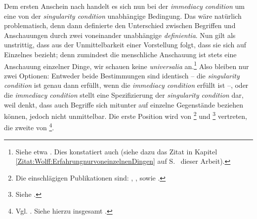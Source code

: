 Dem ersten Anschein nach handelt es sich nun bei der \emph{immediacy condition}
um eine von der \emph{singularity condition} unabhängige Bedingung. Das wäre
natürlich problematisch, denn dann definierte  den
Unterschied zwischen Begriffen und Anschauungen durch zwei voneinander
unabhängige \emph{definientia}. Nun gilt als unstrittig, dass aus der
Unmittelbarkeit einer Vorstellung folgt, dass sie sich auf Einzelnes bezieht;
denn zumindest die menschliche Anschauung ist stets eine Anschauung einzelner
Dinge, wir schauen keine \emph{universalia}
an.\footnote{Siehe etwa \cite[][45]{Parsons:KantsPhilosophyofArithmetic1992}.
Dies konstatiert auch
 (siehe dazu
das Zitat in Kapitel \ref{Zitat:Wolff:ErfahrungnurvoneinzelnenDingen} auf
S.~\pageref{Zitat:Wolff:ErfahrungnurvoneinzelnenDingen} dieser Arbeit).} Also
bleiben nur zwei Optionen: Entweder beide Bestimmungen sind identisch -- die \emph{singularity
condition} ist genau dann erfüllt, wenn die \emph{immediacy condition} erfüllt ist --, oder
die \emph{immediacy condition} stellt eine Spezifizierung der \emph{singularity
condition} dar, weil  denkt, dass auch Begriffe sich
mitunter auf einzelne Gegenstände beziehen können, jedoch nicht unmittelbar. Die
erste Position wird von
\footnote{Die
einschlägigen Publikationen sind: \cite{Hintikka:OnKantsNotionofIntuition1969},
\cite{Hintikka:KantianIntuitions1972}, sowie \cite{Hintikka:KantontheMathematicalMethod1992}.} und
\footnote{Siehe
\cite{Thompson:SingularTermsandIntuitioninKantsEpistemology1972}.} vertreten,
die zweite von
\footnote{Vgl. 
\cite{Parsons:KantsPhilosophyofArithmetic1992}. Siehe hierzu insgesamt
\cite[Vgl.][237]{VanCleve:ProblemsfromKant1999}.}.

